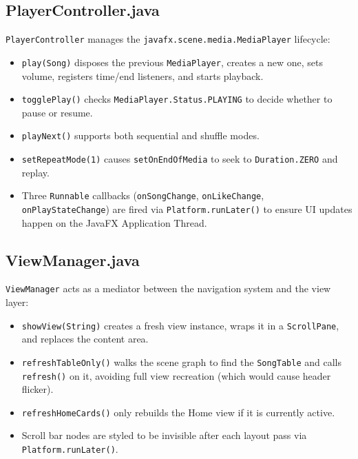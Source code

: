 ﻿\documentclass[12pt]{report}
\begin{document}
\subsection{PlayerController.java}
\texttt{PlayerController} manages the \texttt{javafx.scene.media.MediaPlayer} lifecycle:
\begin{itemize}
    \item \texttt{play(Song)} disposes the previous \texttt{MediaPlayer}, creates a new one, sets volume, registers time/end listeners, and starts playback.
    \item \texttt{togglePlay()} checks \texttt{MediaPlayer.Status.PLAYING} to decide whether to pause or resume.
    \item \texttt{playNext()} supports both sequential and shuffle modes.
    \item \texttt{setRepeatMode(1)} causes \texttt{setOnEndOfMedia} to seek to \texttt{Duration.ZERO} and replay.
    \item Three \texttt{Runnable} callbacks (\texttt{onSongChange}, \texttt{onLikeChange}, \texttt{onPlayStateChange}) are fired via \texttt{Platform.runLater()} to ensure UI updates happen on the JavaFX Application Thread.
\end{itemize}

\subsection{ViewManager.java}
\texttt{ViewManager} acts as a mediator between the navigation system and the view layer:
\begin{itemize}
    \item \texttt{showView(String)} creates a fresh view instance, wraps it in a \texttt{ScrollPane}, and replaces the content area.
    \item \texttt{refreshTableOnly()} walks the scene graph to find the \texttt{SongTable} and calls \texttt{refresh()} on it, avoiding full view recreation (which would cause header flicker).
    \item \texttt{refreshHomeCards()} only rebuilds the Home view if it is currently active.
    \item Scroll bar nodes are styled to be invisible after each layout pass via \texttt{Platform.runLater()}.
\end{itemize}
\end{document}
